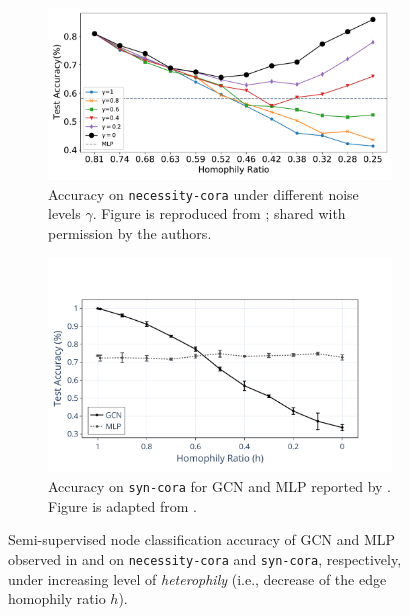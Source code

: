 \begin{figure}
    \centering
    \begin{subfigure}[t]{0.453\textwidth}
        \includegraphics[width=\textwidth]{submissions/Jiong2023/FIG/revisiting-heterophily-GNNs/cora_homo.pdf}
        \caption{Accuracy on \texttt{necessity-cora} %
        under different noise levels $\gamma$. %
        Figure is reproduced from \cite{ma2021homophily}; shared with permission by the authors.}
        \label{fig:revisit-related-observations-necessity-cora}
    \end{subfigure}
    \hspace{0.05\textwidth}
    \begin{subfigure}[t]{0.44\textwidth}
        \includegraphics[width=\textwidth]{submissions/Jiong2023/FIG/revisiting-heterophily-GNNs/syn-cora-GCN-results.pdf}
        \caption{Accuracy on \texttt{syn-cora} for  GCN and MLP reported by \cite{zhu2020beyond}. Figure is adapted from \cite{zhu2020beyond}.}
        \label{fig:revisit-related-observations-syn-cora}
    \end{subfigure}
    \caption{Semi-supervised node classification accuracy of GCN and MLP observed in \cite{ma2021homophily} and \cite{zhu2020beyond} on \texttt{necessity-cora} and \texttt{syn-cora}, respectively, under increasing level of \emph{heterophily} (i.e., decrease of the edge homophily ratio $h$). 
    }
    \label{fig:revisit-related-observations}
\end{figure}

